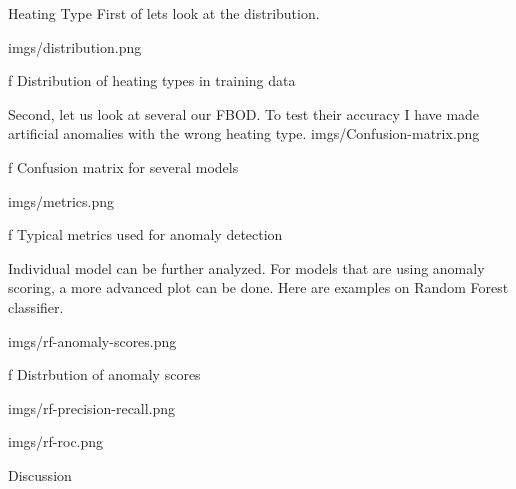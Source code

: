 
\sec Heating Type
First of lets look at the distribution.

\medskip
{}
\picw=15cm \cinspic imgs/distribution.png
\caption/f Distribution of heating types in training data
\medskip


Second, let us look at several our FBOD. To test their accuracy I have made artificial anomalies with the wrong heating type.
\medskip
{}
\picw=15cm \cinspic imgs/Confusion-matrix.png
\caption/f Confusion matrix for several models
\medskip

\medskip
{}
\picw=15cm \cinspic imgs/metrics.png
\caption/f Typical metrics used for anomaly detection
\medskip

\secc Individual model can be further analyzed.
For models that are using anomaly scoring, a more advanced plot can be done. Here are examples on Random Forest classifier.

\medskip
\picw=15cm \cinspic imgs/rf-anomaly-scores.png
\caption/f Distrbution of anomaly scores
\medskip


\medskip
\picw=10cm \cinspic imgs/rf-precision-recall.png
\medskip

\medskip
\picw=10cm \cinspic imgs/rf-roc.png
\medskip

\sec Discussion